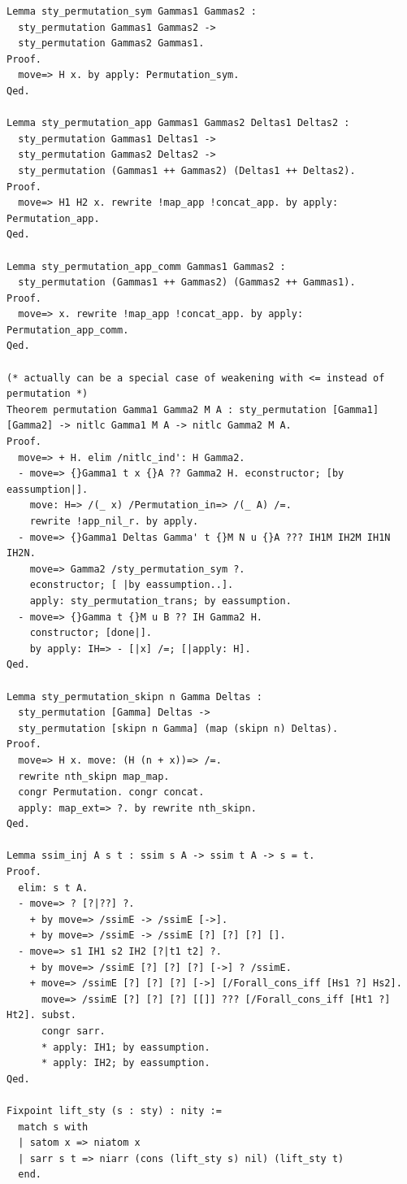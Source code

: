 \documentclass[10pt,a4paper]{article}
\begin{document}
\begin{lstlisting}[style=authorcoq]
Lemma sty_permutation_sym Gammas1 Gammas2 :
  sty_permutation Gammas1 Gammas2 ->
  sty_permutation Gammas2 Gammas1.
Proof.
  move=> H x. by apply: Permutation_sym.
Qed.

Lemma sty_permutation_app Gammas1 Gammas2 Deltas1 Deltas2 :
  sty_permutation Gammas1 Deltas1 ->
  sty_permutation Gammas2 Deltas2 ->
  sty_permutation (Gammas1 ++ Gammas2) (Deltas1 ++ Deltas2).
Proof.
  move=> H1 H2 x. rewrite !map_app !concat_app. by apply: Permutation_app.
Qed.

Lemma sty_permutation_app_comm Gammas1 Gammas2 :
  sty_permutation (Gammas1 ++ Gammas2) (Gammas2 ++ Gammas1).
Proof.
  move=> x. rewrite !map_app !concat_app. by apply: Permutation_app_comm.
Qed.

(* actually can be a special case of weakening with <= instead of permutation *)
Theorem permutation Gamma1 Gamma2 M A : sty_permutation [Gamma1] [Gamma2] -> nitlc Gamma1 M A -> nitlc Gamma2 M A.
Proof.
  move=> + H. elim /nitlc_ind': H Gamma2.
  - move=> {}Gamma1 t x {}A ?? Gamma2 H. econstructor; [by eassumption|].
    move: H=> /(_ x) /Permutation_in=> /(_ A) /=.
    rewrite !app_nil_r. by apply.
  - move=> {}Gamma1 Deltas Gamma' t {}M N u {}A ??? IH1M IH2M IH1N IH2N.
    move=> Gamma2 /sty_permutation_sym ?.
    econstructor; [ |by eassumption..].
    apply: sty_permutation_trans; by eassumption.
  - move=> {}Gamma t {}M u B ?? IH Gamma2 H.
    constructor; [done|].
    by apply: IH=> - [|x] /=; [|apply: H].
Qed.

Lemma sty_permutation_skipn n Gamma Deltas :
  sty_permutation [Gamma] Deltas ->
  sty_permutation [skipn n Gamma] (map (skipn n) Deltas).
Proof.
  move=> H x. move: (H (n + x))=> /=.
  rewrite nth_skipn map_map.
  congr Permutation. congr concat.
  apply: map_ext=> ?. by rewrite nth_skipn.
Qed.

Lemma ssim_inj A s t : ssim s A -> ssim t A -> s = t.
Proof.
  elim: s t A.
  - move=> ? [?|??] ?.
    + by move=> /ssimE -> /ssimE [->].
    + by move=> /ssimE -> /ssimE [?] [?] [?] [].
  - move=> s1 IH1 s2 IH2 [?|t1 t2] ?.
    + by move=> /ssimE [?] [?] [?] [->] ? /ssimE.
    + move=> /ssimE [?] [?] [?] [->] [/Forall_cons_iff [Hs1 ?] Hs2].
      move=> /ssimE [?] [?] [?] [[]] ??? [/Forall_cons_iff [Ht1 ?] Ht2]. subst.
      congr sarr.
      * apply: IH1; by eassumption.
      * apply: IH2; by eassumption.
Qed.

Fixpoint lift_sty (s : sty) : nity :=
  match s with
  | satom x => niatom x
  | sarr s t => niarr (cons (lift_sty s) nil) (lift_sty t)
  end.


\end{lstlisting}
\end{document}
